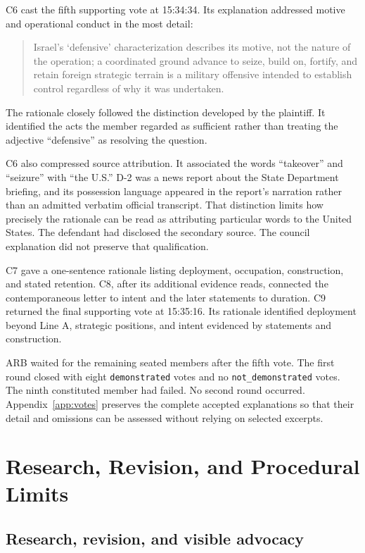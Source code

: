 \documentclass[11pt]{article}
\newcommand{\code}[1]{\texttt{#1}}
\begin{document}
C6 cast the fifth supporting vote at 15:34:34.  Its explanation addressed motive and operational conduct in the most detail:
\begin{quote}
Israel's `defensive' characterization describes its motive, not the nature of the operation; a coordinated ground advance to seize, build on, fortify, and retain foreign strategic terrain is a military offensive intended to establish control regardless of why it was undertaken.
\end{quote}
The rationale closely followed the distinction developed by the plaintiff.  It identified the acts the member regarded as sufficient rather than treating the adjective ``defensive'' as resolving the question.

C6 also compressed source attribution.  It associated the words ``takeover'' and ``seizure'' with ``the U.S.''  D-2 was a news report about the State Department briefing, and its possession language appeared in the report's narration rather than an admitted verbatim official transcript.  That distinction limits how precisely the rationale can be read as attributing particular words to the United States.  The defendant had disclosed the secondary source.  The council explanation did not preserve that qualification.

C7 gave a one-sentence rationale listing deployment, occupation, construction, and stated retention.  C8, after its additional evidence reads, connected the contemporaneous letter to intent and the later statements to duration.  C9 returned the final supporting vote at 15:35:16.  Its rationale identified deployment beyond Line A, strategic positions, and intent evidenced by statements and construction.

ARB waited for the remaining seated members after the fifth vote.  The first round closed with eight \code{demonstrated} votes and no \code{not\_demonstrated} votes.  The ninth constituted member had failed.  No second round occurred.  Appendix~\ref{app:votes} preserves the complete accepted explanations so that their detail and omissions can be assessed without relying on selected excerpts.

\section{Research, Revision, and Procedural Limits}

\subsection{Research, revision, and visible advocacy}
\end{document}
